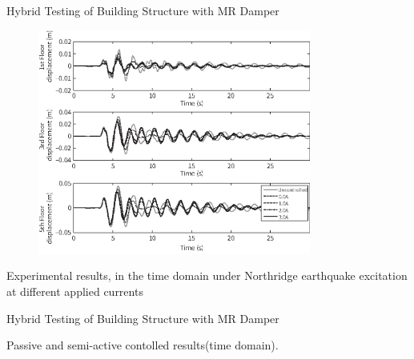 \documentclass[usepdftitle=false]{beamer}
\begin{document}
\begin{frame}{Hybrid Testing of Building Structure with MR Damper}
\begin{figure}[H]
\centering
\includegraphics[width=0.8\textwidth] {figure/8-17.eps}
\label{fig:8-17}
\end{figure}
Experimental results, in the time domain under Northridge earthquake excitation at different applied currents
\end{frame}

\begin{frame}{Hybrid Testing of Building Structure with MR Damper}
\begin{figure}[H]
\centering
\setcounter{subfigure}{0}
\label{fig:8-20}
\end{figure}
Passive and semi-active contolled results(time domain).
\end{frame}
\end{document}
